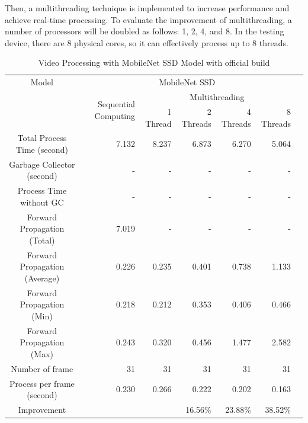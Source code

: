             Then, a multithreading technique is implemented to increase performance and achieve real-time processing.
            To evaluate the improvement of multithreading, a number of processors will be doubled as follows: 1, 2, 4, and 8.
            In the testing device, there are 8 physical cores, so it can effectively process up to 8 threads.

            \begin{table}[!htp]\centering
                \scriptsize
                \begin{tabular}{lrrrrrrr}\toprule
                    \multicolumn{2}{c}{Model} &\multicolumn{5}{c}{MobileNet SSD} \\\cmidrule{1-7}
                    \multicolumn{2}{c}{\multirow{2}{*}{}} &\multirow{2}{*}{Sequential Computing} &\multicolumn{4}{c}{Multithreading} \\\cmidrule{4-7}
                    & & &1 Thread &2 Threads &4 Threads &8 Threads \\\midrule
                    \multicolumn{2}{c}{Total Process Time (second)} &7.132 &8.237 &6.873 &6.270 &5.064 \\
                    \multicolumn{2}{c}{Garbage Collector (second)} &- &- &- &- &- \\
                    \multicolumn{2}{c}{Process Time without GC} &- &- &- &- &- \\
                    \multicolumn{2}{c}{Forward Propagation (Total)} &7.019 &- &- &- &- \\
                    \multicolumn{2}{c}{Forward Propagation (Average)} &0.226 &0.235 &0.401 &0.738 &1.133 \\
                    \multicolumn{2}{c}{Forward Propagation (Min)} &0.218 &0.212 &0.353 &0.406 &0.466 \\
                    \multicolumn{2}{c}{Forward Propagation (Max)} &0.243 &0.320 &0.456 &1.477 &2.582 \\
                    \multicolumn{2}{c}{Number of frame} &31 &31 &31 &31 &31 \\
                    \multicolumn{2}{c}{Process per frame (second)} &0.230 &0.266 &0.222 &0.202 &0.163 \\
                    \multicolumn{2}{c}{Improvement} & & &16.56\% &23.88\% &38.52\% \\
                    \bottomrule
                \end{tabular}

                \caption{Video Processing with MobileNet SSD Model with official build}\label{ssd:official-performace}
            \end{table}

